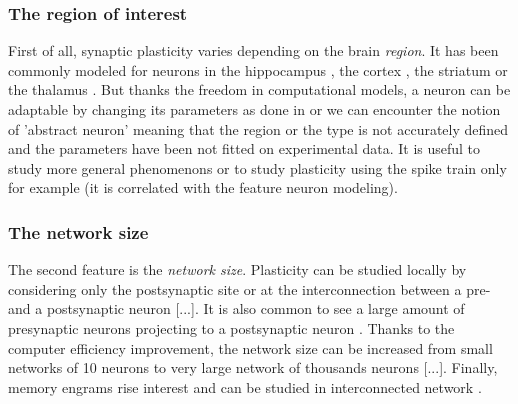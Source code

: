 \subsubsection{The region of interest}
First of all, synaptic plasticity varies depending on the brain \textit{region}. It has been commonly modeled for neurons in the hippocampus \citep{abarbanel_biophysical_2003, van_rossum_stable_2000}, the cortex \citep{chen_heterosynaptic_2013}, the striatum \citep{nakano_kinetic_2010, jedrzejewska-szmek_calcium_2017} or the thalamus \citep{gjorgjieva_burst-time-dependent_2009}. But thanks the freedom in computational models, a neuron can be adaptable by changing its parameters as done in \citep{graupner_calcium-based_2012, clopath_connectivity_2010} or we can encounter the notion of 'abstract neuron' meaning that the region or the type is not accurately defined and the parameters have been not fitted on experimental data. It is useful to study more general phenomenons or to study plasticity using the spike train only for example \citep{karmarkar_model_2002, liu_effects_2015} (it is correlated with the feature neuron modeling). 

\subsubsection{The network size}
The second feature is the \textit{network size}. Plasticity can be studied locally by considering only the postsynaptic site \citep{graupner_calcium-based_2012} or at the interconnection between a pre- and a postsynaptic neuron [...]. It is also common to see a large amount of presynaptic neurons projecting to a postsynaptic neuron \citep{chen_heterosynaptic_2013, gonzalez-rueda_activity-dependent_2018}. Thanks to the computer efficiency improvement, the network size can be increased from small networks of 10 neurons to very large network of thousands neurons [...]. Finally, memory engrams rise interest and can be studied in interconnected network \citep{delamare_intrinsic_2022}.




